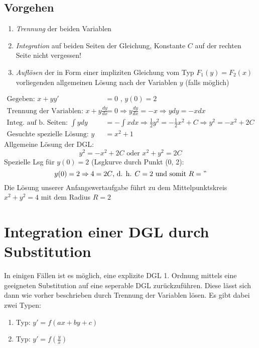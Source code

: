 \subsection{Vorgehen}
\begin{enumerate}
	\item \textit{Trennung} der beiden Variablen
	\item \textit{Integration} auf beiden Seiten der Gleichung, Konstante $C$ auf der rechten Seite nicht vergessen!
	\item \textit{Auflösen} der in Form einer impliziten Gleichung vom Typ $F_1(y) = F_2(x)$ vorliegenden allgemeinen Lösung nach der Variablen $y$ (falls möglich)
\end{enumerate}

\begin{bsp}
\begin{align*}
	 \text{Gegeben: }x + yy' &= 0\text{ , } y(0) = 2\\
	  \text{Trennung der Variablen: } x+y \frac{dy}{dx} &= 0 \Rightarrow y\frac{dy}{dx} = -x \Rightarrow y dy = -x dx \\
	  \text{Integ. auf b. Seiten: } \int y dy &= - \int x dx \Rightarrow \frac{1}{2}y^2 = - \frac{1}{2}x^2 + C \Rightarrow y^2 = -x^2 + 2C \\
	  \text{Gesuchte spezielle Lösung: } y &= x^2 + 1
\end{align*}
Allgemeine Lösung der DGL:
	 $$y^2 = -x ^2 + 2 C \text{      oder      } x^2 + y^2 = 2C$$
Spezielle Lsg für $y(0) = 2$ (Lsgkurve durch Punkt (0, 2):
$$y(0) = 2 \Rightarrow 4 = 2C \text{, d. h. } C = 2 \text{ und somit } R = "$$
Die Lösung unserer Anfangswertaufgabe führt zu dem Mittelpunktskreis $x^2 + y^2 = 4$ mit dem Radius $R = 2$
\end{bsp}

\section{Integration einer DGL durch Substitution}
In einigen Fällen ist es möglich, eine explizite DGL 1. Ordnung mittels eine geeigneten Substitution auf eine seperable DGL zurückzuführen. Diese lässt sich dann wie vorher beschrieben durch Trennung der Variablen lösen. Es gibt dabei zwei Typen:
\begin{enumerate}
	\item Typ: $y' = f(ax + by + c)$
	\item Typ: $y' = f(\frac{y}{x})$
\end{enumerate}

